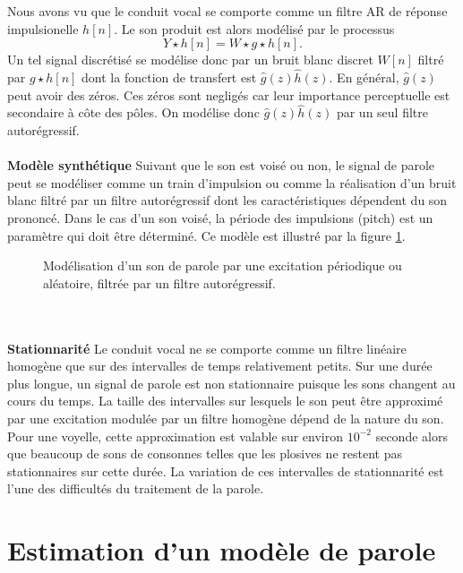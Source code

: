 Nous avons vu que le conduit vocal se comporte
comme un filtre AR de r\'eponse impulsionelle $h [n]$.
Le son produit est alors mod\'elis\'e par le processus
\[
Y \star h [n] = W \star g \star h [n] .
\]
Un tel signal discr\'etis\'e se mod\'elise donc par un bruit blanc discret
$W[n]$ filtr\'e par $g \star h [n]$ dont la fonction de transfert
est $\hat g (z) \hat h (z)$.
En g\'en\'eral, $\hat g (z)$
peut avoir des z\'eros. Ces z\'eros sont neglig\'es car leur importance
perceptuelle est secondaire \`a c\^ote des p\^oles. On mod\'elise donc
$\hat g (z) \hat h (z)$ par un seul filtre autor\'egressif.
\\
\\
{\bf Mod\`ele synth\'etique}
Suivant que le son est vois\'e ou non, le signal de parole peut
se mod\'eliser comme un train d'impulsion ou
comme la r\'ealisation d'un bruit
blanc filtr\'e par un filtre autor\'egressif
dont les caract\'eristiques d\'ependent
du son prononc\'e. Dans le cas d'un son vois\'e, la p\'eriode des
impulsions (pitch) est un param\`etre qui doit \^etre d\'etermin\'e.
Ce mod\`ele est illustr\'e par la
figure \ref{modele-parole}.


\begin{figure}[bhtp]
\centerline{
	\leavevmode{}}
\caption{Mod\'elisation d'un son de parole par une excitation
p\'eriodique ou al\'eatoire, filtr\'ee par un filtre autor\'egressif.}
\label{modele-parole}
\end{figure}
\\
\\
\noindent
{\bf Stationnarit\'e}
Le conduit vocal ne se comporte comme un filtre lin\'eaire
homog\`ene que sur des intervalles de temps relativement petits.
Sur une dur\'ee plus longue,
un signal de parole est non stationnaire
puisque les sons changent au cours du temps. La taille des  intervalles
sur lesquels le son peut \^etre approxim\'e par une excitation
modul\'ee par un filtre homog\`ene d\'epend de la nature du son.
Pour une voyelle, cette approximation est valable sur environ
$10^{-2}$ seconde alors que beaucoup de sons de
consonnes telles que les plosives
ne restent pas stationnaires sur cette dur\'ee.
La variation de ces intervalles de stationnarit\'e est l'une des
difficult\'es du traitement de la parole.

\section{Estimation d'un mod\`ele de parole}
\label{est-par-sec}

